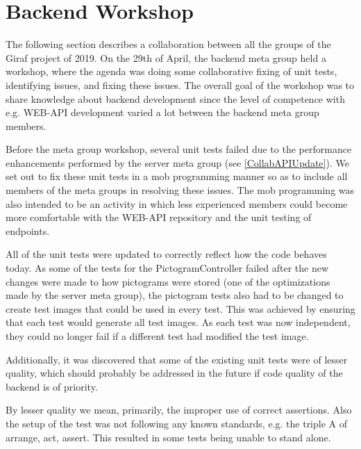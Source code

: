 \section{Backend Workshop} \label{SEC:workshopAPIcollab}
The following section describes a collaboration between all the groups of the Giraf project of 2019. 
On the 29th of April, the backend meta group held a workshop, where the agenda was doing some collaborative fixing of unit tests, identifying issues, and fixing these issues. 
The overall goal of the workshop was to share knowledge about backend development since the level of competence with e.g. WEB-API development varied a lot between the backend meta group members.

Before the meta group workshop, several unit tests failed due to the performance enhancements performed by the server meta group (see \autoref{CollabAPIUpdate}). 
We set out to fix these unit tests in a mob programming manner so as to include all members of the meta groups in resolving these issues.
The mob programming was also intended to be an activity in which less experienced members could become more comfortable with the WEB-API repository and the unit testing of endpoints.

All of the unit tests were updated to correctly reflect how the code behaves today.
As some of the tests for the PictogramController failed after the new changes were made to how pictograms were stored (one of the optimizations made by the server meta group), the pictogram tests also had to be changed to create test images that could be used in every test.
This was achieved by ensuring that each test would generate all test images.
As each test was now independent, they could no longer fail if a different test had modified the test image.

Additionally, it was discovered that some of the existing unit tests were of lesser quality, which should probably be addressed in the future if code quality of the backend is of priority.

By lesser quality we mean, primarily, the improper use of correct assertions. 
Also the setup of the test was not following any known standards, e.g. the triple A of arrange, act, assert. 
This resulted in some tests being unable to stand alone.

